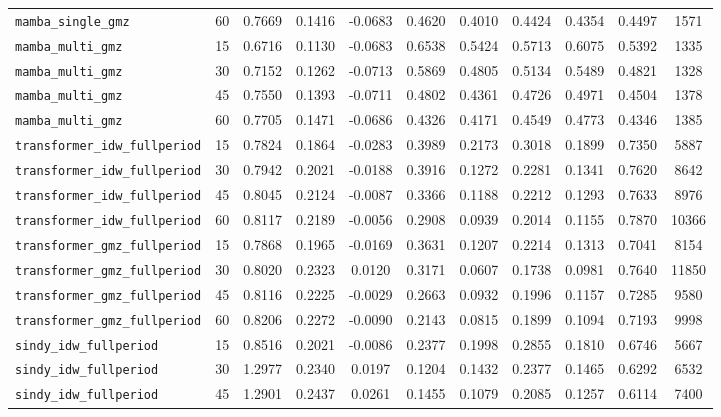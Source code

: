 \documentclass[12pt, a4paper]{article}
\begin{document}
{\begin{longtable}{p{4.0cm}cccccccccc}
\texttt{mamba\_single\_gmz} & 60 & 0.7669 & 0.1416 & -0.0683 & 0.4620 & 0.4010 & 0.4424 & 0.4354 & 0.4497 & 1571 \\
\addlinespace[1pt]
\texttt{mamba\_multi\_gmz} & 15 & 0.6716 & 0.1130 & -0.0683 & 0.6538 & 0.5424 & 0.5713 & 0.6075 & 0.5392 & 1335 \\
\texttt{mamba\_multi\_gmz} & 30 & 0.7152 & 0.1262 & -0.0713 & 0.5869 & 0.4805 & 0.5134 & 0.5489 & 0.4821 & 1328 \\
\texttt{mamba\_multi\_gmz} & 45 & 0.7550 & 0.1393 & -0.0711 & 0.4802 & 0.4361 & 0.4726 & 0.4971 & 0.4504 & 1378 \\
\texttt{mamba\_multi\_gmz} & 60 & 0.7705 & 0.1471 & -0.0686 & 0.4326 & 0.4171 & 0.4549 & 0.4773 & 0.4346 & 1385 \\
\addlinespace[1pt]
\texttt{transformer\_idw\_fullperiod} & 15 & 0.7824 & 0.1864 & -0.0283 & 0.3989 & 0.2173 & 0.3018 & 0.1899 & 0.7350 & 5887 \\
\texttt{transformer\_idw\_fullperiod} & 30 & 0.7942 & 0.2021 & -0.0188 & 0.3916 & 0.1272 & 0.2281 & 0.1341 & 0.7620 & 8642 \\
\texttt{transformer\_idw\_fullperiod} & 45 & 0.8045 & 0.2124 & -0.0087 & 0.3366 & 0.1188 & 0.2212 & 0.1293 & 0.7633 & 8976 \\
\texttt{transformer\_idw\_fullperiod} & 60 & 0.8117 & 0.2189 & -0.0056 & 0.2908 & 0.0939 & 0.2014 & 0.1155 & 0.7870 & 10366 \\
\addlinespace[1pt]
\texttt{transformer\_gmz\_fullperiod} & 15 & 0.7868 & 0.1965 & -0.0169 & 0.3631 & 0.1207 & 0.2214 & 0.1313 & 0.7041 & 8154 \\
\texttt{transformer\_gmz\_fullperiod} & 30 & 0.8020 & 0.2323 & 0.0120 & 0.3171 & 0.0607 & 0.1738 & 0.0981 & 0.7640 & 11850 \\
\texttt{transformer\_gmz\_fullperiod} & 45 & 0.8116 & 0.2225 & -0.0029 & 0.2663 & 0.0932 & 0.1996 & 0.1157 & 0.7285 & 9580 \\
\texttt{transformer\_gmz\_fullperiod} & 60 & 0.8206 & 0.2272 & -0.0090 & 0.2143 & 0.0815 & 0.1899 & 0.1094 & 0.7193 & 9998 \\
\addlinespace[1pt]
\texttt{sindy\_idw\_fullperiod} & 15 & 0.8516 & 0.2021 & -0.0086 & 0.2377 & 0.1998 & 0.2855 & 0.1810 & 0.6746 & 5667 \\
\texttt{sindy\_idw\_fullperiod} & 30 & 1.2977 & 0.2340 & 0.0197 & 0.1204 & 0.1432 & 0.2377 & 0.1465 & 0.6292 & 6532 \\
\texttt{sindy\_idw\_fullperiod} & 45 & 1.2901 & 0.2437 & 0.0261 & 0.1455 & 0.1079 & 0.2085 & 0.1257 & 0.6114 & 7400 \\

\end{longtable}}
\end{document}
